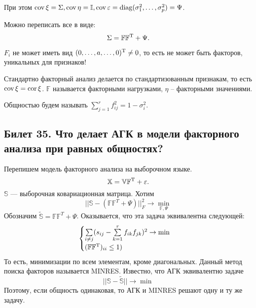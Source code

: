 При этом $\operatorname{cov} \xi = \Sigma, \operatorname{cov} \eta = \mathbb{I}, \operatorname{cov} \varepsilon = \operatorname{diag}(\sigma^2_1, \ldots, \sigma^2_p) = \Psi$.

Можно переписать все в виде:
\begin{equation*}
\Sigma = \mathbb{F}\mathbb{F}^{\operatorname*{T}} + \Psi.
\end{equation*}
\begin{note}
$F_i$ не может иметь вид $(0, \ldots, a, \ldots, 0)^{\operatorname*{T}} \ne  0$, то есть не может быть факторов, уникальных для признаков!
\end{note}

Стандартно факторный анализ делается по стандартизованным признакам, то есть $\operatorname{cov} \xi = \operatorname{cor} \xi$.
$\mathbb{F}$ называется факторными нагрузками, $\eta$ -- факторными значениями.

Общностью будем называть $\sum\limits_{j = 1}^{r} f^2_{ij} = 1 - \sigma^2_i$.

\subsection{Билет 35. Что делает АГК в модели факторного анализа при равных общностях?}
Перепишем модель факторного анализа на выборочном языке.
\begin{equation*}
\mathbb{X} = \mathbb{V}\mathbb{F}^{\operatorname*{T}} + \varepsilon.
\end{equation*}
$\mathbb{S}$ --- выборочная ковариационная матрица. 
Хотим 
\begin{equation*}
|| \mathbb{S} - (\mathbb{F}\mathbb{F}^T + \Psi)||^2_{F} \to \min\limits_{\mathbb{F}, \Psi}
\end{equation*}
Обозначим $\tilde{\mathbb{S}} = \mathbb{F}\mathbb{F}^T + \Psi$.
Оказывается, что эта задача эквивалентна следующей:
\begin{equation*}
\begin{cases}
\sum\limits_{i \ne j}(s_{ij} - \sum\limits_{k = 1}^{r} f_{ik}f_{jk})^2 \to \min \\
(\mathbb{F}\mathbb{F}^{\operatorname*{T}})_{ii} \le 1) 
\end{cases}
\end{equation*}
То есть, минимизации по всем элементам, кроме диагональных.
Данный метод поиска факторов называется MINRES.
Известно, что АГК эквивалентно задаче
\begin{equation}
||\mathbb{S} - \tilde{\mathbb{S}}|| \to \min
\end{equation}
Поэтому, если общность одинаковая, то АГК и MINRES решают одну и ту же задачу.